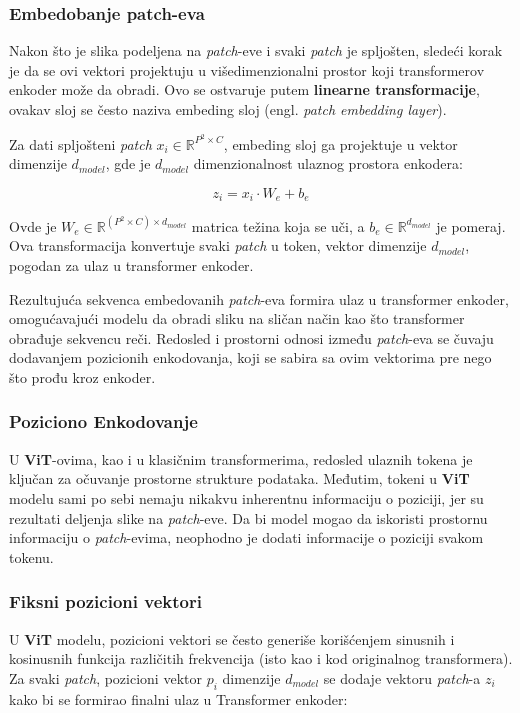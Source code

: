 \documentclass[12pt]{article}
\begin{document}
   \subsubsection*{Embedobanje patch-eva}

   Nakon što je slika podeljena na \textit{patch}-eve i svaki \textit{patch} je spljošten, 
   sledeći korak je da se ovi vektori projektuju u višedimenzionalni prostor koji transformerov 
   enkoder može da obradi. Ovo se ostvaruje putem \textbf{linearne transformacije}, ovakav sloj 
   se često naziva embeding sloj (engl. \textit{patch embedding layer}).

   Za dati spljošteni \textit{patch} \( x_i \in \mathbb{R}^{P^2 \times C} \), embeding sloj 
   ga projektuje u vektor dimenzije \( d_{model} \), gde je \( d_{model} \) dimenzionalnost 
   ulaznog prostora enkodera:

   \[
   z_i = x_i \cdot W_e + b_e
   \]

   Ovde je \( W_e \in \mathbb{R}^{(P^2 \times C) \times d_{model}} \) matrica težina koja se uči, 
   a \( b_e \in \mathbb{R}^{d_{model}} \) je pomeraj. Ova transformacija konvertuje svaki 
   \textit{patch} u token, vektor dimenzije \( d_{model} \), pogodan za ulaz u transformer enkoder.

   Rezultujuća sekvenca embedovanih \textit{patch}-eva formira ulaz u transformer enkoder, 
   omogućavajući modelu da obradi sliku na sličan način kao što transformer obrađuje sekvencu reči. 
   Redosled i prostorni odnosi između \textit{patch}-eva se čuvaju dodavanjem pozicionih enkodovanja, 
   koji se sabira sa ovim vektorima pre nego što prođu kroz enkoder.

   \subsubsection{Poziciono Enkodovanje}
   U \textbf{ViT}-ovima, kao i u klasičnim transformerima, redosled ulaznih tokena je ključan 
   za očuvanje prostorne strukture podataka. Međutim, tokeni u \textbf{ViT} modelu sami po sebi 
   nemaju nikakvu inherentnu informaciju o poziciji, jer su rezultati deljenja slike na 
   \textit{patch}-eve. Da bi model mogao da iskoristi prostornu informaciju o \textit{patch}-evima, 
   neophodno je dodati informacije o poziciji svakom tokenu.


   \subsubsection*{Fiksni pozicioni vektori}
   U \textbf{ViT} modelu, pozicioni vektori se često generiše korišćenjem sinusnih i kosinusnih 
   funkcija različitih frekvencija (isto kao i kod originalnog transformera). Za svaki 
   \textit{patch}, pozicioni vektor \( p_i \) dimenzije \( d_{model} \) se dodaje 
   vektoru \textit{patch}-a \( z_i \) kako bi se formirao finalni ulaz u Transformer enkoder:
\end{document}
